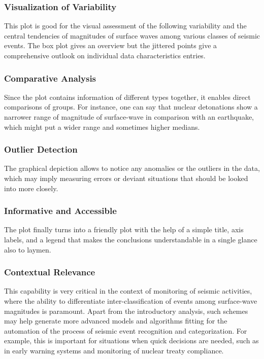 \documentclass[
]{article}
\begin{document}
\subsubsection{Visualization of
Variability}\label{visualization-of-variability}

This plot is good for the visual assessment of the following variability
and the central tendencies of magnitudes of surface waves among various
classes of seismic events. The box plot gives an overview but the
jittered points give a comprehensive outlook on individual data
characteristics entries.

\subsubsection{Comparative Analysis}\label{comparative-analysis}

Since the plot contains information of different types together, it
enables direct comparisons of groups. For instance, one can say that
nuclear detonations show a narrower range of magnitude of surface-wave
in comparison with an earthquake, which might put a wider range and
sometimes higher medians.

\subsubsection{Outlier Detection}\label{outlier-detection-1}

The graphical depiction allows to notice any anomalies or the outliers
in the data, which may imply measuring errors or deviant situations that
should be looked into more closely.

\subsubsection{Informative and
Accessible}\label{informative-and-accessible}

The plot finally turns into a friendly plot with the help of a simple
title, axis labels, and a legend that makes the conclusions
understandable in a single glance also to laymen.

\subsubsection{Contextual Relevance}\label{contextual-relevance-1}

This capability is very critical in the context of monitoring of seismic
activities, where the ability to differentiate inter-classification of
events among surface-wave magnitudes is paramount. Apart from the
introductory analysis, such schemes may help generate more advanced
models and algorithms fitting for the automation of the process of
seismic event recognition and categorization. For example, this is
important for situations when quick decisions are needed, such as in
early warning systems and monitoring of nuclear treaty compliance.
\end{document}
